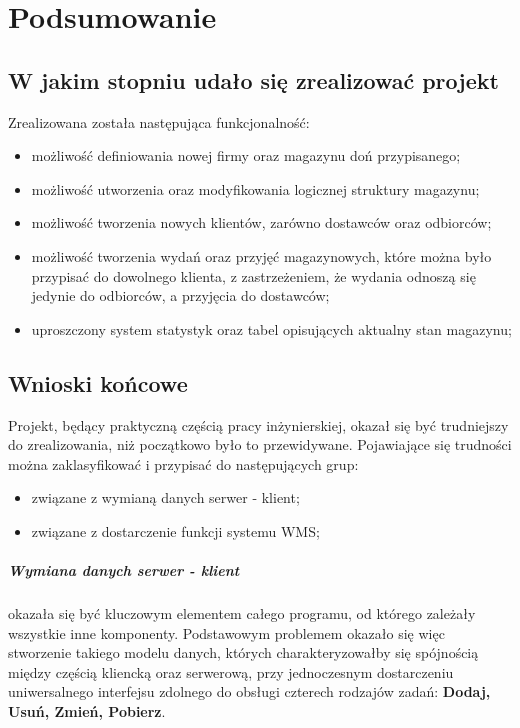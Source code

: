 \chapter{Podsumowanie}
\label{c7:c7}

	\section{W jakim stopniu udało się zrealizować projekt}
		Zrealizowana została następująca funkcjonalność:
		\begin{itemize}
			\item możliwość definiowania nowej firmy oraz magazynu doń przypisanego;
			\item możliwość utworzenia oraz modyfikowania logicznej struktury magazynu;
			\item możliwość tworzenia nowych klientów, zarówno dostawców oraz odbiorców;
			\item możliwość tworzenia wydań oraz przyjęć magazynowych, które można było przypisać do
			dowolnego klienta, z zastrzeżeniem, że wydania odnoszą się jedynie do odbiorców, a przyjęcia
			do dostawców;
			\item uproszczony system statystyk oraz tabel opisujących aktualny stan magazynu;
		\end{itemize}
	\section{Wnioski końcowe}
		Projekt, będący praktyczną częścią pracy inżynierskiej, okazał się być trudniejszy do zrealizowania,
		niż początkowo było to przewidywane. Pojawiające się trudności można zaklasyfikować i przypisać 
		do następujących grup:
		\begin{itemize}
			\item związane z wymianą danych serwer - klient;
			\item związane z dostarczenie funkcji systemu WMS; 
		\end{itemize}		
		
		\paragraph{Wymiana danych serwer - klient} okazała się być kluczowym elementem całego programu, 
		od którego zależały wszystkie inne komponenty. Podstawowym problemem okazało się więc stworzenie
		takiego modelu danych, których charakteryzowałby się spójnością między częścią kliencką oraz serwerową,
		przy jednoczesnym dostarczeniu uniwersalnego interfejsu zdolnego do obsługi czterech rodzajów
		zadań: \textbf{Dodaj, Usuń, Zmień, Pobierz}. 
		
